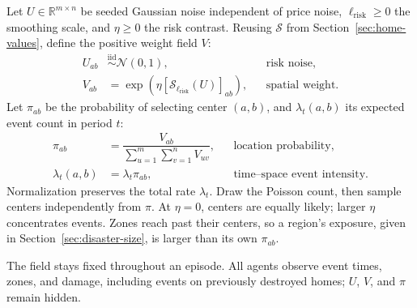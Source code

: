 \documentclass[10pt]{article}
\begin{document}
Let $U\in\mathbb{R}^{m\times n}$ be seeded Gaussian noise independent of price noise, $\ell_{\mathrm{risk}}\geq0$ the smoothing scale, and $\eta\geq0$ the risk contrast. Reusing $\mathcal{S}$ from Section~\ref{sec:home-values}, define the positive weight field $V$:
\begin{equation}
\begin{aligned}
 U_{ab}&\overset{\mathrm{iid}}{\sim}\mathcal{N}(0,1),
 & &\text{risk noise},\\[5pt]
 V_{ab}&=\exp\!\left(\eta[\mathcal{S}_{\ell_{\mathrm{risk}}}(U)]_{ab}\right),
 & &\text{spatial weight}.
\end{aligned}
\end{equation}
Let $\pi_{ab}$ be the probability of selecting center $(a,b)$, and $\lambda_t(a,b)$ its expected event count in period $t$:
\begin{equation}
\begin{aligned}
 \pi_{ab}&=\dfrac{V_{ab}}{\displaystyle\sum_{u=1}^{m}\sum_{v=1}^{n}V_{uv}},
 & &\text{location probability},\\[8pt]
 \lambda_t(a,b)&=\lambda_t\pi_{ab},
 & &\text{time--space event intensity}.
\end{aligned}
\end{equation}
Normalization preserves the total rate $\lambda_t$. Draw the Poisson count, then sample centers independently from $\pi$. At $\eta=0$, centers are equally likely; larger $\eta$ concentrates events. Zones reach past their centers, so a region's exposure, given in Section~\ref{sec:disaster-size}, is larger than its own $\pi_{ab}$.

The field stays fixed throughout an episode. All agents observe event times, zones, and damage, including events on previously destroyed homes; $U$, $V$, and $\pi$ remain hidden.
\end{document}
